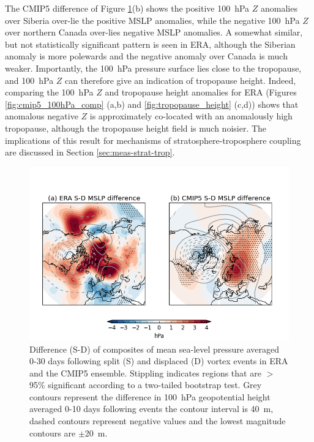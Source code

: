 The CMIP5 difference of Figure \ref{fig:cmip5_mslp_diff}(b) shows the positive
100~hPa $Z$ anomalies over Siberia over-lie the positive MSLP anomalies, while
the negative 100~hPa $Z$ over northern Canada over-lies negative MSLP
anomalies. A somewhat similar, but not statistically significant pattern is seen
in ERA, although the Siberian anomaly is more polewards and the negative anomaly
over Canada is much weaker. Importantly, the 100~hPa pressure surface lies close
to the tropopause, and 100~hPa $Z$ can therefore give an indication of
tropopause height. Indeed, comparing the 100~hPa $Z$ and tropopause height
anomalies for ERA (Figures \ref{fig:cmip5_100hPa_comp} (a,b) and
\ref{fig:tropopause_height} (c,d)) shows that anomalous negative $Z$ is
approximately co-located with an anomalously high tropopause, although the
tropopause height field is much noisier. The implications of this result for
mechanisms of stratosphere-troposphere coupling are discussed in Section
\ref{sec:meas-strat-trop}.



\begin{figure}
 \centering
 \noindent\includegraphics[width=\textwidth]{figures/chapter-models/mslp_diff.png}
 \caption[Difference of MSLP following split and displaced vortex
 events.]{Difference (S-D) of composites of mean sea-level pressure averaged
   0-30 days following split (S) and displaced (D) vortex events in ERA and the
   CMIP5 ensemble. Stippling indicates regions that are $>$95\% significant
   according to a two-tailed bootstrap test. Grey contours represent the
   difference in 100~hPa geopotential height averaged 0-10 days following events
   the contour interval is 40~m, dashed contours represent negative values and
   the lowest magnitude contours are $\pm$20~m. }
 \label{fig:cmip5_mslp_diff}
\end{figure}





